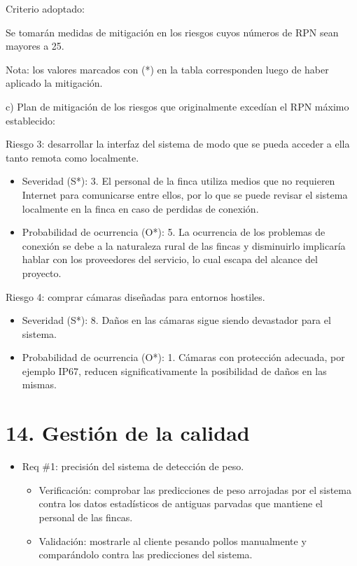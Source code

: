 \documentclass[
11pt, %
]{charter}
\begin{document}
Criterio adoptado: 

Se tomarán medidas de mitigación en los riesgos cuyos números de RPN sean mayores a 25.

Nota: los valores marcados con (*) en la tabla corresponden luego de haber aplicado la mitigación.

c) Plan de mitigación de los riesgos que originalmente excedían el RPN máximo establecido:
 
Riesgo 3: desarrollar la interfaz del sistema de modo que se pueda acceder a ella tanto remota como localmente.
  \begin{itemize}
	\item Severidad (S*): 3.
          El personal de la finca utiliza medios que no requieren Internet para comunicarse entre ellos, por lo que se puede revisar el sistema localmente en la finca en caso de perdidas de conexión.
	\item Probabilidad de ocurrencia (O*): 5.
          La ocurrencia de los problemas de conexión se debe a la naturaleza rural de las fincas y disminuirlo implicaría hablar con los proveedores del servicio, lo cual escapa del alcance del proyecto.
	\end{itemize}

Riesgo 4: comprar cámaras diseñadas para entornos hostiles.
  \begin{itemize}
	\item Severidad (S*): 8.
          Daños en las cámaras sigue siendo devastador para el sistema.
	\item Probabilidad de ocurrencia (O*): 1.
          Cámaras con protección adecuada, por ejemplo IP67, reducen significativamente la posibilidad de daños en las mismas.
	\end{itemize}



\section{14. Gestión de la calidad}
\label{sec:calidad}

\begin{itemize} 
\item Req \#1: precisión del sistema de detección de peso.
	\begin{itemize}
	\item Verificación: comprobar las predicciones de peso arrojadas por el sistema contra los datos estadísticos de antiguas parvadas que mantiene el personal de las fincas.
	\item Validación: mostrarle al cliente pesando pollos manualmente y comparándolo contra las predicciones del sistema.
	\end{itemize}
\end{itemize}
\end{document}
